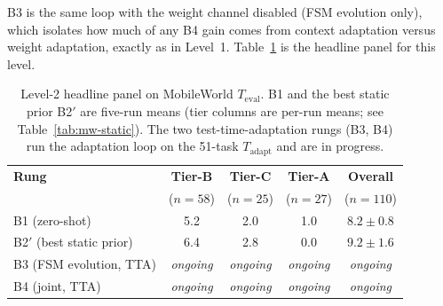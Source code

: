 B3 is the same loop with the weight channel disabled (FSM evolution only), which
isolates how much of any B4 gain comes from context adaptation versus weight
adaptation, exactly as in Level~1. Table~\ref{tab:mw-main} is the headline panel
for this level.

\begin{table}[t]
\small
\centering
\begin{tabular}{lcccc}
\hline
\textbf{Rung} & \textbf{Tier-B} & \textbf{Tier-C} & \textbf{Tier-A} & \textbf{Overall} \\
              & ($n{=}58$) & ($n{=}25$) & ($n{=}27$) & ($n{=}110$) \\
\hline
B1 (zero-shot)            & 5.2 & 2.0 & 1.0 & $8.2\pm0.8$ \\
B2$'$ (best static prior) & 6.4 & 2.8 & 0.0 & $9.2\pm1.6$ \\
B3 (FSM evolution, TTA)   & \emph{ongoing} & \emph{ongoing} & \emph{ongoing} & \emph{ongoing} \\
B4 (joint, TTA)           & \emph{ongoing} & \emph{ongoing} & \emph{ongoing} & \emph{ongoing} \\
\hline
\end{tabular}
\caption{Level-2 headline panel on MobileWorld $T_{\text{eval}}$. B1 and the
best static prior B2$'$ are five-run means (tier columns are per-run means; see
Table~\ref{tab:mw-static}). The two test-time-adaptation rungs (B3, B4) run the
adaptation loop on the 51-task $T_{\text{adapt}}$ and are in progress.}
\label{tab:mw-main}
\end{table}

